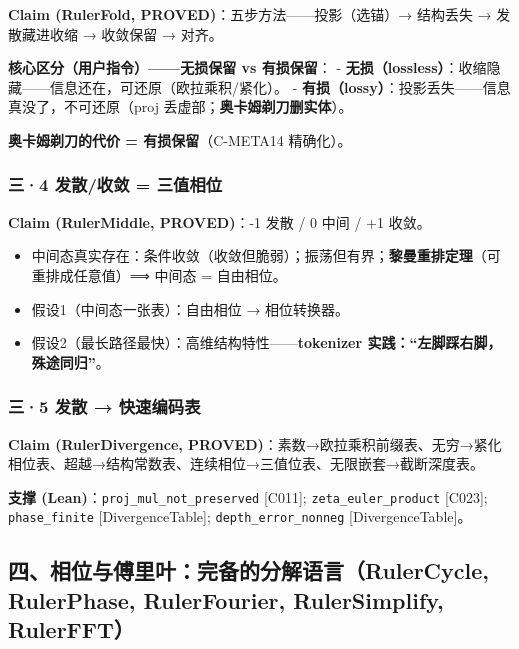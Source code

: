 \documentclass[
]{article}
\providecommand{\tightlist}{%
  \setlength{\itemsep}{0pt}\setlength{\parskip}{0pt}}
\begin{document}
\textbf{Claim (RulerFold, PROVED)}：五步方法------投影（选锚）→ 结构丢失
→ 发散藏进收缩 → 收敛保留 → 对齐。

\textbf{核心区分（用户指令）------无损保留 vs 有损保留}： -
\textbf{无损（lossless）}：收缩隐藏------信息还在，可还原（欧拉乘积/紧化）。
- \textbf{有损（lossy）}：投影丢失------信息真没了，不可还原（proj
丢虚部；\textbf{奥卡姆剃刀删实体}）。

\textbf{奥卡姆剃刀的代价 = 有损保留}（C-META14 精确化）。

\subsubsection{三·4 发散/收敛 =
三值相位}\label{ux4e094-ux53d1ux6563ux6536ux655b-ux4e09ux503cux76f8ux4f4d}

\textbf{Claim (RulerMiddle, PROVED)}：-1 发散 / 0 中间 / +1 收敛。

\begin{itemize}
\tightlist
\item
  中间态真实存在：条件收敛（收敛但脆弱）；振荡但有界；\textbf{黎曼重排定理}（可重排成任意值）⟹
  中间态 = 自由相位。
\item
  假设1（中间态一张表）：自由相位 → 相位转换器。
\item
  假设2（最长路径最快）：高维结构特性------\textbf{tokenizer
  实践：``左脚踩右脚，殊途同归''}。
\end{itemize}

\subsubsection{三·5 发散 →
快速编码表}\label{ux4e095-ux53d1ux6563-ux5febux901fux7f16ux7801ux8868}

\textbf{Claim (RulerDivergence,
PROVED)}：素数→欧拉乘积前缀表、无穷→紧化相位表、超越→结构常数表、连续相位→三值位表、无限嵌套→截断深度表。

\textbf{支撑 (Lean)}：\texttt{proj\_mul\_not\_preserved} {[}C011{]};
\texttt{zeta\_euler\_product} {[}C023{]}; \texttt{phase\_finite}
{[}DivergenceTable{]}; \texttt{depth\_error\_nonneg}
{[}DivergenceTable{]}。

\subsection{四、相位与傅里叶：完备的分解语言（RulerCycle, RulerPhase,
RulerFourier, RulerSimplify,
RulerFFT）}\label{ux56dbux76f8ux4f4dux4e0eux5085ux91ccux53f6ux5b8cux5907ux7684ux5206ux89e3ux8bedux8a00rulercycle-rulerphase-rulerfourier-rulersimplify-rulerfft}
\end{document}
